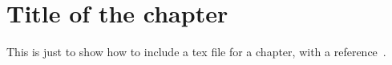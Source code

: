 \chapter{Title of the chapter}
This is just to show how to include a tex file for a chapter, with a reference~\citep{Dijkstra-1968}.

